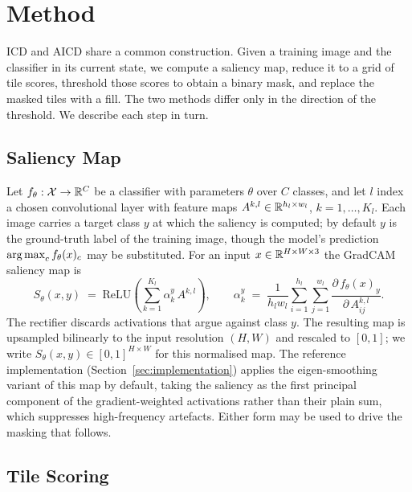 \section{Method}
\label{sec:method}

ICD and AICD share a common construction.  Given a training image and the
classifier in its current state, we compute a saliency map, reduce it to a grid
of tile scores, threshold those scores to obtain a binary mask, and replace the
masked tiles with a fill.  The two methods differ only in the direction of the
threshold.  We describe each step in turn.

\subsection{Saliency Map}
\label{sec:method:saliency}

Let $f_\theta : \mathcal{X} \to \mathbb{R}^{C}$ be a classifier with parameters
$\theta$ over $C$ classes, and let $l$ index a chosen convolutional layer with
feature maps $A^{k,l} \in \mathbb{R}^{h_l \times w_l}$, $k = 1,\dots,K_l$.  Each image
carries a target class $y$ at which the saliency is computed; by default $y$ is
the ground-truth label of the training image, though the model's prediction
$\operatorname*{arg\,max}_c f_\theta(x)_c$ may be substituted.  For an input
$x \in \mathbb{R}^{H \times W \times 3}$ the GradCAM~\citep{selvaraju2017gradcam}
saliency map is
\begin{equation}
  S_\theta(x,y)
  \;=\;
  \mathrm{ReLU}\!\left( \sum_{k=1}^{K_l} \alpha_k^{y}\, A^{k,l} \right),
  \qquad
  \alpha_k^{y}
  \;=\;
  \frac{1}{h_l w_l} \sum_{i=1}^{h_l} \sum_{j=1}^{w_l}
  \frac{\partial\, f_\theta(x)_{y}}{\partial\, A^{k,l}_{ij}} .
  \label{eq:gradcam}
\end{equation}
The rectifier discards activations that argue against class $y$.  The resulting
map is upsampled bilinearly to the input resolution $(H,W)$ and rescaled to
$[0,1]$; we write $S_\theta(x,y) \in [0,1]^{H \times W}$ for this normalised
map.  The reference implementation (Section~\ref{sec:implementation}) applies
the eigen-smoothing variant of this map by default, taking the saliency as the
first principal component of the gradient-weighted activations rather than their
plain sum, which suppresses high-frequency artefacts.  Either form may be used
to drive the masking that follows.

\subsection{Tile Scoring}
\label{sec:method:tiles}

